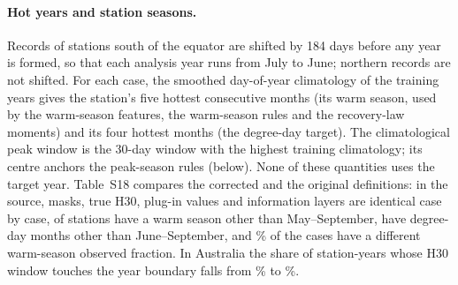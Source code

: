 \documentclass[draft]{agujournal2025}
\begin{document}
\paragraph{Hot years and station seasons.} Records of stations south of the equator are shifted by 184 days before any year is formed, so that each analysis year runs from July to June; northern records are not shifted. For each case, the smoothed day-of-year climatology of the training years gives the station's five hottest consecutive months (its warm season, used by the warm-season features, the warm-season rules and the recovery-law moments) and its four hottest months (the degree-day target). The climatological peak window is the 30-day window with the highest training climatology; its centre anchors the peak-season rules (below). None of these quantities uses the target year. Table~S18 compares the corrected and the original definitions: in the source, masks, true H30, plug-in values and information layers are identical case by case, \TDefWarmNotMaySep{} of \TDefStations{} stations have a warm season other than May--September, \TDefDDNotJunSep{} have degree-day months other than June--September, and \TDefWarmChanged\% of the cases have a different warm-season observed fraction. In Australia the share of station-years whose H30 window touches the year boundary falls from \TAuEdgeBefore\% to \TAuEdgeAfter\%.
\end{document}
